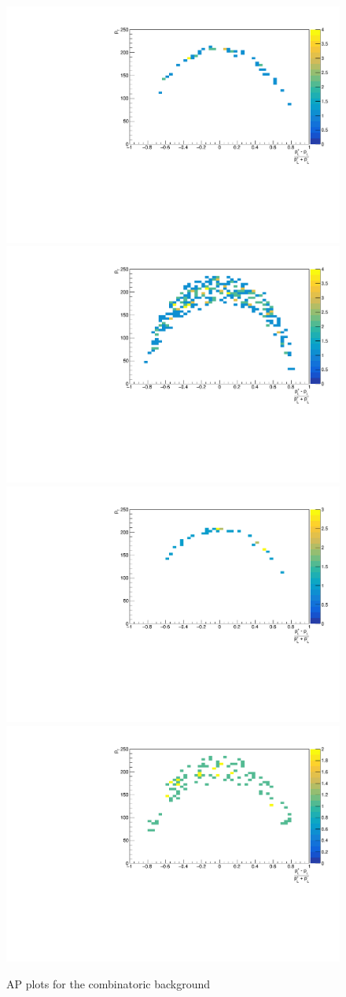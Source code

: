 \begin{figure}
\includegraphics[width=0.5\linewidth]{figures/massProjections/applot_KPicombinatoric_LL.pdf}
\hfill
\includegraphics[width=0.5\linewidth]{figures/massProjections/applot_KPicombinatoric_DD.pdf}
\hfill
\includegraphics[width=0.5\linewidth]{figures/massProjections/applot_KPi2combinatoric_LL.pdf}
\hfill
\includegraphics[width=0.5\linewidth]{figures/massProjections/applot_KPi2combinatoric_DD.pdf}
\caption{AP plots for the combinatoric background}
\label{APplots}
\end{figure}

